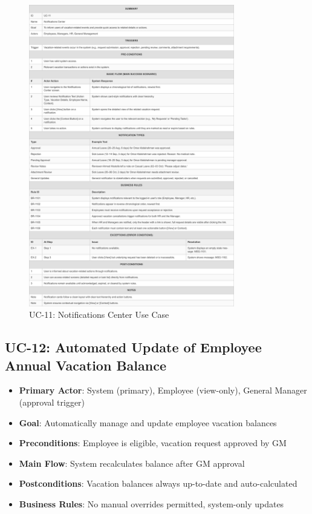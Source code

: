 \documentclass[12pt,a4paper]{article}
\begin{document}
\begin{figure}[H]
\centering
\includegraphics[width=0.8\textwidth]{Use-Cases/UC-11-Notifications-Center/UC-11-Notifications-Center-1.png}
\caption{UC-11: Notifications Center Use Case}
\label{fig:uc11}
\end{figure}

\subsection{UC-12: Automated Update of Employee Annual Vacation Balance}
\begin{itemize}
    \item \textbf{Primary Actor}: System (primary), Employee (view-only), General Manager (approval trigger)
    \item \textbf{Goal}: Automatically manage and update employee vacation balances
    \item \textbf{Preconditions}: Employee is eligible, vacation request approved by GM
    \item \textbf{Main Flow}: System recalculates balance after GM approval
    \item \textbf{Postconditions}: Vacation balances always up-to-date and auto-calculated
    \item \textbf{Business Rules}: No manual overrides permitted, system-only updates
\end{itemize}
\end{document}
